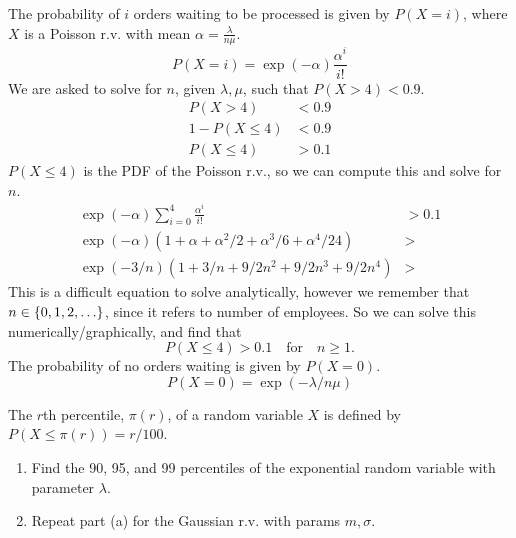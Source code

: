 \documentclass{article}
\begin{document}
    \begin{solution}
        The probability of $i$ orders waiting to be processed is given by $P(X = i)$, where $X$ is a Poisson r.v. with mean $\alpha = \frac{\lambda} {n \mu}$.
        \begin{equation*}
            P(X = i) = \exp(-\alpha) \frac{\alpha^i} {i!}
        \end{equation*}
        We are asked to solve for $n$, given $\lambda, \mu$, such that $P(X > 4) < 0.9$.
        \begin{align*}
            P(X > 4) &< 0.9 \\
            1 - P(X \leq 4) &< 0.9 \\
            P(X \leq 4) &> 0.1
        \end{align*}
        $P(X \leq 4)$ is the PDF of the Poisson r.v., so we can compute this and solve for $n$.
        \begin{align*}
            \exp(-\alpha) \sum_{i = 0}^4 \frac{\alpha^i} {i!}  &> 0.1 \\
            \exp(-\alpha) (1 + \alpha + \alpha^2/2 + \alpha^3/6 + \alpha^4/24) &> \\
            \exp(-3/n) (1 + 3/n + 9/2n^2 + 9/2n^3 + 9/2n^4) &> 
        \end{align*}
        This is a difficult equation to solve analytically, however we remember that $n \in \{0,1,2,\ldots\}$, since it refers to number of employees. So we can solve this numerically/graphically, and find that 
        \begin{equation}
            P(X \leq 4) > 0.1 \quad \mathrm{ for } \quad n \geq 1. 
        \end{equation}
        The probability of no orders waiting is given by $P (X = 0)$.
        \begin{equation}
            P(X = 0) = \exp(-\lambda / n \mu)
        \end{equation}
    \end{solution}


    \nextproblem
    \nextproblem
    \begin{problem}
        The $r$th percentile, $\pi(r)$, of a random variable $X$ is defined by $P ( X \leq \pi(r)) = r/100$.
        \begin{enumerate}[label=(\alph*)]
            \item Find the 90, 95, and 99 percentiles of the exponential random variable with parameter $\lambda$.
            \item Repeat part (a) for the Gaussian r.v. with params $m, \sigma$.
        \end{enumerate}
    \end{problem}
    
\end{document}
